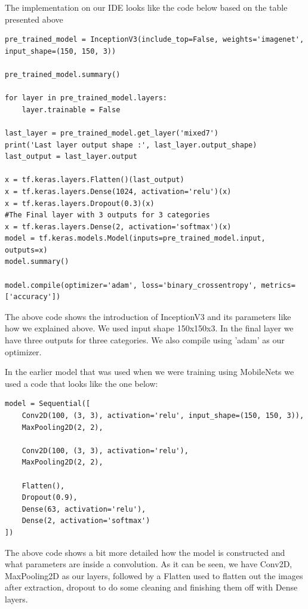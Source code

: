 The implementation on our IDE looks like the code below based on the table presented above
\begin{lstlisting}
pre_trained_model = InceptionV3(include_top=False, weights='imagenet', input_shape=(150, 150, 3))

pre_trained_model.summary()

for layer in pre_trained_model.layers:
    layer.trainable = False

last_layer = pre_trained_model.get_layer('mixed7')
print('Last layer output shape :', last_layer.output_shape)
last_output = last_layer.output

x = tf.keras.layers.Flatten()(last_output)
x = tf.keras.layers.Dense(1024, activation='relu')(x)
x = tf.keras.layers.Dropout(0.3)(x)
#The Final layer with 3 outputs for 3 categories
x = tf.keras.layers.Dense(2, activation='softmax')(x)
model = tf.keras.models.Model(inputs=pre_trained_model.input, outputs=x)
model.summary()

model.compile(optimizer='adam', loss='binary_crossentropy', metrics=['accuracy'])
\end{lstlisting}

The above code shows the introduction of InceptionV3 and its parameters like how we explained above. We used input shape 150x150x3. In the final layer we have three outputs for three categories. We also compile using 'adam' as our optimizer.
\vspace{4mm}

In the earlier model that was used when we were training using MobileNets we used a code that looks like the one below:

\begin{lstlisting}
model = Sequential([
    Conv2D(100, (3, 3), activation='relu', input_shape=(150, 150, 3)),
    MaxPooling2D(2, 2),

    Conv2D(100, (3, 3), activation='relu'),
    MaxPooling2D(2, 2),

    Flatten(),
    Dropout(0.9),
    Dense(63, activation='relu'),
    Dense(2, activation='softmax')
])

\end{lstlisting}
\vspace{4mm}

The above code shows a bit more detailed how the model is constructed and what parameters are inside a convolution. As it can be seen, we have Conv2D, MaxPooling2D as our layers, followed by a Flatten used to flatten out the images after extraction, dropout to do some cleaning and finishing them off with Dense layers.

